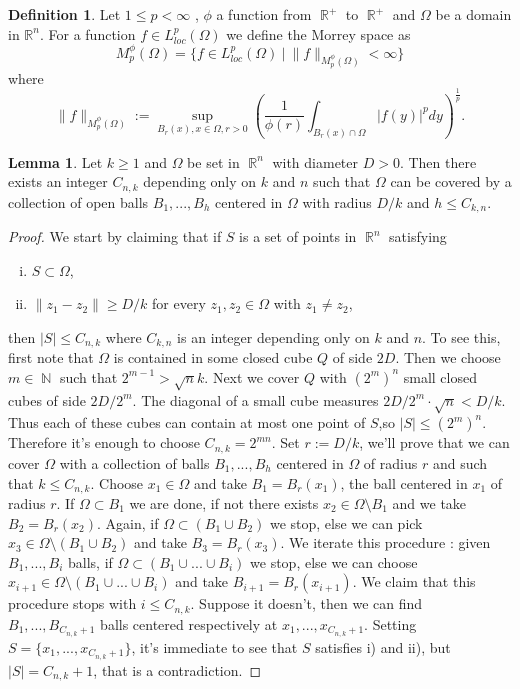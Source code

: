 \documentclass[12pt]{article}
\theoremstyle{definition}
\newtheorem{definition}{Definition}
\newtheorem{lemma}{Lemma}
\DeclareMathOperator\rr{\mathbb{R}}
\DeclareMathOperator\nn{\mathbb{N}}
\begin{document}
\begin{definition}
Let $1\le p< \infty$ , $\phi$ a function from $\rr^+$ to $\rr^+$ and $\Omega$ be a domain in $\mathbb{R}^n$. For a function $f \in L^p_{loc}(\Omega)$ we define the Morrey space as
\[ M_p^\phi(\Omega)=\{f \in  L^p_{loc}(\Omega) \ |\  \|f\|_{M_p^\phi(\Omega)}<\infty\}\]
where
\[ \|f\|_{M_p^\phi(\Omega)}:=\sup_{B_r(x), x \in \Omega,r>0} \left(  \frac{1}{\phi(r)}\int_{B_r(x)\cap \Omega} |f(y)|^p dy \right )^{\frac{1}{p}}.\]

\end{definition}
\begin{lemma}\label{covering}
Let $k\ge 1$ and $\Omega$ be set in $\rr^n$ with diameter $D>0$. Then there exists an integer $C_{n,k}$ depending only on $k$ and $n$ such that $\Omega$ can be covered by a collection of open balls $B_1,...,B_h$ centered in $\Omega$ with radius $D/k$ and $h \le C_{k,n}.$
\end{lemma}
\begin{proof}
We start by claiming that if $S$ is a set of points in $\rr^n$ satisfying
\begin{enumerate}[i)]
\item  	$S \subset \Omega$,
\item $\|z_1-z_2 \|\ge D/k$ for every $z_1,z_2 \in \Omega$ with $z_1 \neq z_2$,
\end{enumerate}
then $|S|\le C_{n,k}$ where $C_{k,n}$ is an integer depending only on $k$ and $n$. To see this, first note that $\Omega$ is contained in some closed cube $Q$ of side $2D$. Then we choose $m \in \nn$ such that $2^{m-1}>\sqrt n k$. Next we cover $Q$ with $(2^m)^n$ small closed cubes of side $2D/2^m$. The diagonal of a small cube measures $2D/2^m \cdot \sqrt n < D/k$. Thus each of these cubes can contain at most one point of $S$,so $|S|\le (2^m)^n.$ Therefore it's enough to choose $C_{n,k}=2^{mn}.$ Set $r:=D/k$, we'll prove that we can cover $\Omega$ with a collection of balls $B_1,...,B_h$ centered in $\Omega$ of radius $r$ and such that $k\le C_{n,k}.$ Choose $x_1 \in \Omega$ and take $B_1=B_r(x_1)$, the ball centered in $x_1$ of radius $r$. If $\Omega \subset B_1$ we are done, if not there exists $x_2 \in \Omega\setminus B_1$ and we take $B_2=B_r(x_2).$ Again, if $\Omega \subset (B_1\cup B_2)$ we stop, else we can pick $x_3 \in  \Omega\setminus (B_1 \cup B_2)$ and take $B_3=B_r(x_3).$ We iterate this procedure : given $B_1,...,B_i$ balls, if $ \Omega \subset (B_1\cup...\cup B_i)$ we stop, else we can choose $x_{i+1} \in  \Omega \setminus (B_1\cup...\cup B_i)$ and take $B_{i+1}=B_r(x_{i+1}).$ We claim that this procedure stops with $i\le C_{n,k}.$ Suppose it doesn't, then we can find $B_1,...,B_{C_{n,k}+1}$ balls centered respectively at $x_1,...,x_{C_{n,k}+1}$. Setting $S= \{x_1,...,x_{C_{n,k}+1} \}$, it's immediate to see that $S$ satisfies i) and ii), but $|S|=C_{n,k}+1$, that is a contradiction.
\end{proof}
\end{document}
